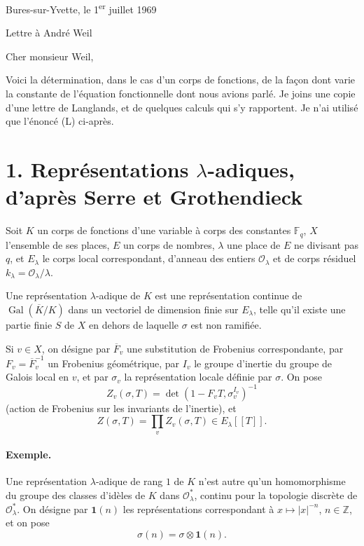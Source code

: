 \documentclass[11pt]{article}
\newcommand{\Fq}{\mathbb F_q}
\newcommand{\Gal}{\operatorname{Gal}}
\newcommand{\cO}{\mathcal O}
\begin{document}
\begin{center}
Bures-sur-Yvette, le 1\textsuperscript{er} juillet 1969

\vspace{1.0cm}
{\Large Lettre à André Weil}
\end{center}

\vspace{0.4cm}
Cher monsieur Weil,

Voici la détermination, dans le cas d'un corps de fonctions, de la façon dont varie la constante de l'équation fonctionnelle dont nous avions parlé. Je joins une copie d'une lettre de Langlands, et de quelques calculs qui s'y rapportent. Je n'ai utilisé que l'énoncé (L) ci-après.

\section*{1. Représentations $\lambda$-adiques, d'après Serre et Grothendieck}

Soit $K$ un corps de fonctions d'une variable à corps des constantes $\Fq$, $X$ l'ensemble de ses places, $E$ un corps de nombres, $\lambda$ une place de $E$ ne divisant pas $q$, et $E_\lambda$ le corps local correspondant, d'anneau des entiers $\cO_\lambda$ et de corps résiduel $k_\lambda=\cO_\lambda/\lambda$.

Une représentation $\lambda$-adique de $K$ est une représentation continue de $\Gal(\overline K/K)$ dans un vectoriel de dimension finie sur $E_\lambda$, telle qu'il existe une partie finie $S$ de $X$ en dehors de laquelle $\sigma$ est non ramifiée.

Si $v\in X$, on désigne par $\overline F_v$ une substitution de Frobenius correspondante, par $F_v=\overline F_v^{-1}$ un Frobenius géométrique, par $I_v$ le groupe d'inertie du groupe de Galois local en $v$, et par $\sigma_v$ la représentation locale définie par $\sigma$. On pose
\[
 Z_v(\sigma,T)=\det(1-F_vT,\sigma_v^{I_v})^{-1}
\]
(action de Frobenius sur les invariants de l'inertie), et
\[
 Z(\sigma,T)=\prod_v Z_v(\sigma,T)\in E_\lambda[[T]].
\]

\paragraph{Exemple.} Une représentation $\lambda$-adique de rang $1$ de $K$ n'est autre qu'un homomorphisme du groupe des classes d'idèles de $K$ dans $\cO_\lambda^*$, continu pour la topologie discrète de $\cO_\lambda^*$. On désigne par $\mathbf 1(n)$ les représentations correspondant à $x\mapsto |x|^{-n}$, $n\in\mathbb Z$, et on pose
\[
 \sigma(n)=\sigma\otimes \mathbf 1(n).
\]
\end{document}
